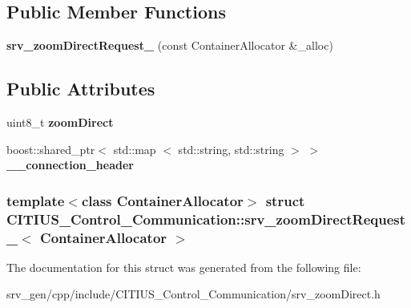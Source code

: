 \subsection*{\-Public \-Member \-Functions}
\begin{DoxyCompactItemize}
\item 
\hypertarget{struct_c_i_t_i_u_s___control___communication_1_1srv__zoom_direct_request___a9e24a30ac7105cbe2df248c1b6365723}{{\bfseries srv\-\_\-zoom\-Direct\-Request\-\_\-} (const \-Container\-Allocator \&\-\_\-alloc)}\label{struct_c_i_t_i_u_s___control___communication_1_1srv__zoom_direct_request___a9e24a30ac7105cbe2df248c1b6365723}

\end{DoxyCompactItemize}
\subsection*{\-Public \-Attributes}
\begin{DoxyCompactItemize}
\item 
\hypertarget{struct_c_i_t_i_u_s___control___communication_1_1srv__zoom_direct_request___a9cfb1b7dc980647506703dd2137cf53d}{uint8\-\_\-t {\bfseries zoom\-Direct}}\label{struct_c_i_t_i_u_s___control___communication_1_1srv__zoom_direct_request___a9cfb1b7dc980647506703dd2137cf53d}

\item 
\hypertarget{struct_c_i_t_i_u_s___control___communication_1_1srv__zoom_direct_request___ac43d442b3773ab263a2031f531aa6d4e}{boost\-::shared\-\_\-ptr$<$ std\-::map\*
$<$ std\-::string, std\-::string $>$ $>$ {\bfseries \-\_\-\-\_\-connection\-\_\-header}}\label{struct_c_i_t_i_u_s___control___communication_1_1srv__zoom_direct_request___ac43d442b3773ab263a2031f531aa6d4e}

\end{DoxyCompactItemize}
\subsubsection*{template$<$class Container\-Allocator$>$ struct C\-I\-T\-I\-U\-S\-\_\-\-Control\-\_\-\-Communication\-::srv\-\_\-zoom\-Direct\-Request\-\_\-$<$ Container\-Allocator $>$}



\-The documentation for this struct was generated from the following file\-:\begin{DoxyCompactItemize}
\item 
srv\-\_\-gen/cpp/include/\-C\-I\-T\-I\-U\-S\-\_\-\-Control\-\_\-\-Communication/srv\-\_\-zoom\-Direct.\-h\end{DoxyCompactItemize}
